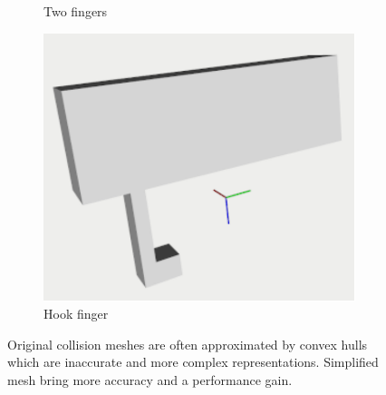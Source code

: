 \begin{figure}[t]
\begin{subfigure}{0.3\columnwidth}
    \caption{Two fingers}
\end{subfigure}%
\hfill
\begin{subfigure}{0.3\columnwidth}
    \includegraphics[width=\linewidth]{framework_manipulation/figures/hardware/single_hook_cropped.pdf}
    \caption{Hook finger}
\end{subfigure}

\caption{Original collision meshes are often approximated by convex hulls which are inaccurate and more complex representations. Simplified mesh bring more accuracy and a performance gain.}\label{fig:1}

\end{figure}

 
